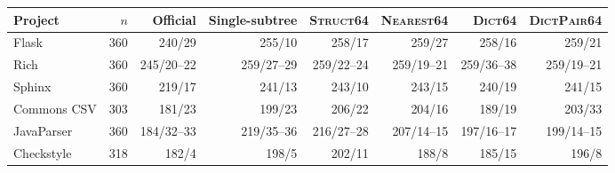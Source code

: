 \begin{tabular}{lrrrrrrr}
\toprule
Project & $n$ & Official & Single-subtree & \textsc{Struct64} & \textsc{Nearest64} & \textsc{Dict64} & \textsc{DictPair64} \\
\midrule
Flask & 360 & 240/29 & 255/10 & 258/17 & 259/27 & 258/16 & 259/21 \\
Rich & 360 & 245/20--22 & 259/27--29 & 259/22--24 & 259/19--21 & 259/36--38 & 259/19--21 \\
Sphinx & 360 & 219/17 & 241/13 & 243/10 & 243/15 & 240/19 & 241/15 \\
Commons CSV & 303 & 181/23 & 199/23 & 206/22 & 204/16 & 189/19 & 203/33 \\
JavaParser & 360 & 184/32--33 & 219/35--36 & 216/27--28 & 207/14--15 & 197/16--17 & 199/14--15 \\
Checkstyle & 318 & 182/4 & 198/5 & 202/11 & 188/8 & 185/15 & 196/8 \\
\bottomrule
\end{tabular}

